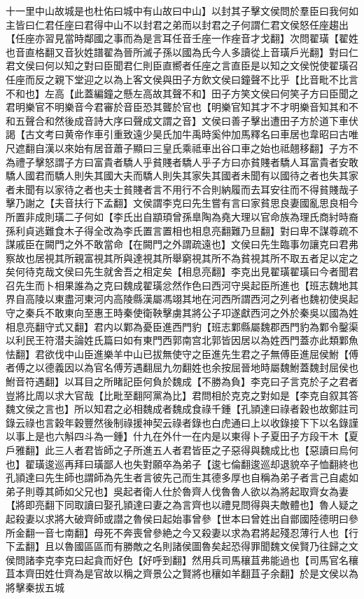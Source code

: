 十一里中山故城是也杜佑曰城中有山故曰中山】以封其子擊文侯問於羣臣曰我何如主皆曰仁君任座曰君得中山不以封君之弟而以封君之子何謂仁君文侯怒任座趨出【任座亦習見當時鄰國之事而為是言耳任音壬座一作痤音才戈翻】次問翟璜【翟姓也音直格翻又音狄姓譜翟為晉所滅子孫以國為氏今人多讀從上音璜戶光翻】對曰仁君文侯曰何以知之對曰臣聞君仁則臣直嚮者任座之言直臣是以知之文侯悦使翟璜召任座而反之親下堂迎之以為上客文侯與田子方飲文侯曰鐘聲不比乎【比音毗不比言不和也】左高【此蓋編鐘之懸左高故其聲不和】田子方笑文侯曰何笑子方曰臣聞之君明樂官不明樂音今君審於音臣恐其聾於官也【明樂官知其才不才明樂音知其和不和五聲合和然後成音詩大序曰聲成文謂之音】文侯曰善子擊出遭田子方於道下車伏謁【古文考曰黄帝作車引重致遠少昊氏加牛禹時奚仲加馬釋名曰車居也韋昭曰古唯尺遮翻自漢以來始有居音蕭子顯曰三皇氏乘祗車出谷口車之始也祗翹移翻】子方不為禮子擊怒謂子方曰富貴者驕人乎貧賤者驕人乎子方曰亦貧賤者驕人耳富貴者安敢驕人國君而驕人則失其國大夫而驕人則失其家失其國者未聞有以國待之者也失其家者未聞有以家待之者也夫士貧賤者言不用行不合則納履而去耳安往而不得貧賤哉子擊乃謝之【夫音扶行下孟翻】文侯謂李克曰先生嘗有言曰家貧思良妻國亂思良相今所置非成則璜二子何如【李氏出自顓頊曾孫臯陶為堯大理以官命族為理氏商紂時裔孫利貞逃難食木子得全改為李氏置言置相也相息亮翻難乃旦翻】對曰卑不謀尊疏不謀戚臣在闕門之外不敢當命【在闕門之外謂疏遠也】文侯曰先生臨事勿讓克曰君弗察故也居視其所親富視其所與達視其所舉窮視其所不為貧視其所不取五者足以定之矣何待克哉文侯曰先生就舍吾之相定矣【相息亮翻】李克出見翟璜翟璜曰今者聞君召先生而卜相果誰為之克曰魏成翟璜忿然作色曰西河守吳起臣所進也【班志魏地其界自高陵以東盡河東河内高陵縣漢屬馮翊其地在河西所謂西河之列者也魏初使吳起守之秦兵不敢東向至惠王時秦使衛鞅擊虜其將公子卭遂獻西河之外於秦吳以國為姓相息亮翻守式又翻】君内以鄴為憂臣進西門豹【班志鄴縣屬魏郡西門豹為鄴令鑿渠以利民王符潜夫論姓氏篇曰如有東門西郭南宫北郭皆因居以為姓西門蓋亦此類鄴魚怯翻】君欲伐中山臣進樂羊中山已拔無使守之臣進先生君之子無傅臣進屈侯鮒【傅者傅之以德義因以為官名傅芳遇翻屈九勿翻姓也余按屈晉地時屬魏鮒蓋魏封屈侯也鮒音符遇翻】以耳目之所睹記臣何負於魏成【不勝為負】李克曰子言克於子之君者豈將比周以求大官哉【比毗至翻阿黨為比】君問相於克克之對如是【李克自叙其答魏文侯之言也】所以知君之必相魏成者魏成食祿千鍾【孔頴達曰祿者穀也故鄭註司錄云祿也言穀年穀豐然後制祿援神契云祿者錄也白虎通曰上以收錄接下下以名錄謹以事上是也六斛四斗為一鍾】什九在外什一在内是以東得卜子夏田子方段干木【夏戶雅翻】此三人者君皆師之子所進五人者君皆臣之子惡得與魏成比也【惡讀曰烏何也】翟璜逡巡再拜曰璜鄙人也失對願卒為弟子【逡七倫翻逡巡却退貌卒子恤翻終也孔頴達曰先生師也謂師為先生者言彼先己而生其德多厚也自稱為弟子者言己自處如弟子則尊其師如父兄也】吳起者衛人仕於魯齊人伐魯魯人欲以為將起取齊女為妻【將即亮翻下同取讀曰娶孔頴達曰妻之為言齊也以禮見問得與夫敵體也】魯人疑之起殺妻以求將大破齊師或譛之魯侯曰起始事曾參【世本曰曾姓出自鄫國陸德明曰參所金翻一音七南翻】母死不奔喪曾參絶之今又殺妻以求為君將起殘忍薄行人也【行下孟翻】且以魯國區區而有勝敵之名則諸侯圖魯矣起恐得罪聞魏文侯賢乃往歸之文侯問諸李克李克曰起貪而好色【好呼到翻】然用兵司馬穰苴弗能過也【司馬官名穰苴本齊田姓仕齊為是官故以稱之齊景公之賢將也穰如羊翻苴子余翻】於是文侯以為將擊秦拔五城
